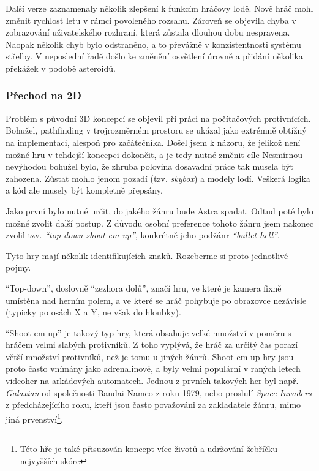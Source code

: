 \documentclass[12pt,a4paper,hidelinks]{article}
\begin{document}
Další verze zaznamenaly několik zlepšení k funkcím hráčovy lodě. Nově hráč mohl změnit rychlost letu v rámci povoleného rozsahu. Zároveň se objevila chyba v zobrazování uživatelského rozhraní, která zůstala dlouhou dobu nespravena. Naopak několik chyb bylo odstraněno, a to převážně v konzistentnosti systému střelby. V neposlední řadě došlo ke změnění osvětlení úrovně a přidání několika překážek v podobě asteroidů.


\subsubsection{Přechod na 2D}
Problém s původní 3D koncepcí se objevil při práci na počítačových protivnících. Bohužel, pathfinding v trojrozměrném prostoru se ukázal jako extrémně obtížný na implementaci, alespoň pro začátečníka. Došel jsem k názoru, že jelikož není možné hru v tehdejší koncepci dokončit, a je tedy nutné změnit cíle Nesmírnou nevýhodou bohužel bylo, že zhruba polovina dosavadní práce tak musela být zahozena. Zůstat mohlo jenom pozadí (tzv. \textit{skybox}) a modely lodí. Veškerá logika a kód ale musely být kompletně přepsány.

Jako první bylo nutné určit, do jakého žánru bude Astra spadat. Odtud poté bylo možné zvolit další postup. Z důvodu osobní preference tohoto žánru jsem nakonec zvolil tzv. \textit{\enquote{top-down shoot-em-up}}, konkrétně jeho podžánr \textit{\enquote{bullet hell}}.

Tyto hry mají několik identifikujících znaků. Rozeberme si proto jednotlivé pojmy.

\enquote{Top-down}, doslovně \enquote{zezhora dolů}, značí hru, ve které je kamera fixně umístěna nad herním polem, a ve které se hráč pohybuje po obrazovce nezávisle (typicky po osách X a Y, ne však do hloubky).

\enquote{Shoot-em-up} je takový typ hry, která obsahuje velké množství v poměru s hráčem velmi slabých protivníků. Z toho vyplývá, že hráč za určitý čas porazí větší množství protivníků, než je tomu u jiných žánrů. Shoot-em-up hry jsou proto často vnímány jako adrenalinové, a byly velmi populární v raných letech videoher na arkádových automatech. Jednou z prvních takových her byl např. \textit{Galaxian}\cite{galaxian} od společnosti Bandai-Namco z roku 1979, nebo proslulí \textit{Space Invaders}\cite{spaceinvaders} z předcházejícího roku, kteří jsou často považováni za zakladatele žánru, mimo jiná prvenství\footnote{Této hře je také přisuzován koncept více životů a udržování žebříčku nejvyšších skóre}.
\end{document}
